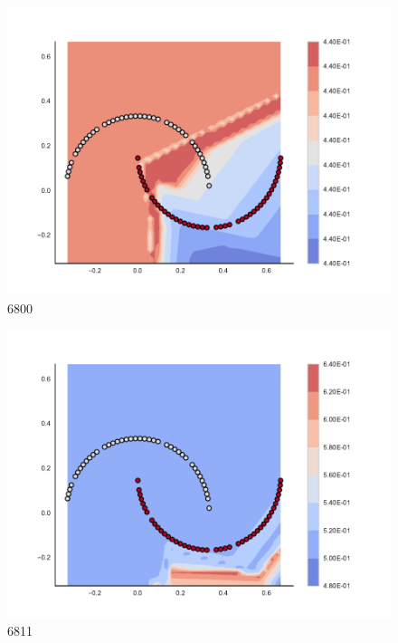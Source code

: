 \begin{subfigure}[b]{0.09\textwidth}
    \includegraphics[clip, trim=2.35cm 1.75cm 4.5cm 0cm,width=\textwidth]{img/convergence/6800.pdf}
    \caption{6800}
    \label{fig:convergence_6800}
\end{subfigure}
%
\begin{subfigure}[b]{0.09\textwidth}
    \includegraphics[clip, trim=2.35cm 1.75cm 4.5cm 0cm,width=\textwidth]{img/convergence/6811.pdf}
    \caption{6811}
    \label{fig:convergence_6811}
\end{subfigure}
%
